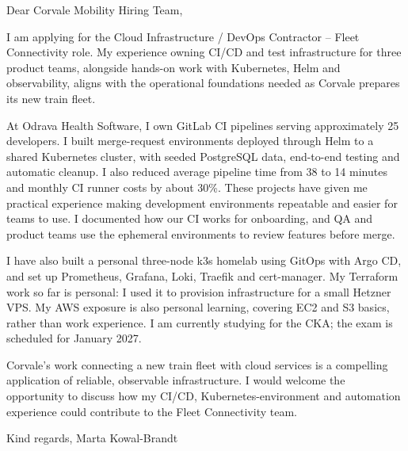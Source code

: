 \documentclass[11pt,a4paper]{article}
\begin{document}
Dear Corvale Mobility Hiring Team,

I am applying for the Cloud Infrastructure / DevOps Contractor -- Fleet Connectivity role. My experience owning CI/CD and test infrastructure for three product teams, alongside hands-on work with Kubernetes, Helm and observability, aligns with the operational foundations needed as Corvale prepares its new train fleet.

At Odrava Health Software, I own GitLab CI pipelines serving approximately 25 developers. I built merge-request environments deployed through Helm to a shared Kubernetes cluster, with seeded PostgreSQL data, end-to-end testing and automatic cleanup. I also reduced average pipeline time from 38 to 14 minutes and monthly CI runner costs by about 30\%. These projects have given me practical experience making development environments repeatable and easier for teams to use. I documented how our CI works for onboarding, and QA and product teams use the ephemeral environments to review features before merge.

I have also built a personal three-node k3s homelab using GitOps with Argo CD, and set up Prometheus, Grafana, Loki, Traefik and cert-manager. My Terraform work so far is personal: I used it to provision infrastructure for a small Hetzner VPS. My AWS exposure is also personal learning, covering EC2 and S3 basics, rather than work experience. I am currently studying for the CKA; the exam is scheduled for January 2027.

Corvale’s work connecting a new train fleet with cloud services is a compelling application of reliable, observable infrastructure. I would welcome the opportunity to discuss how my CI/CD, Kubernetes-environment and automation experience could contribute to the Fleet Connectivity team.

Kind regards,
Marta Kowal-Brandt
\end{document}
